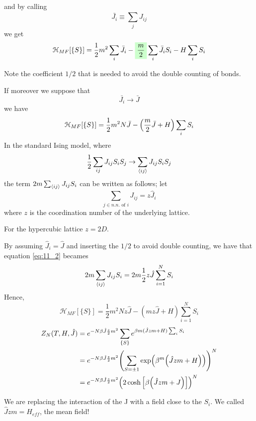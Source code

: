 \documentclass[../main/main.tex]{subfiles}
\begin{document}
and by calling
\begin{equation}
  \bar{J_i} \equiv  \sum_{j}^{} J_{ij}
\end{equation}
we get
\begin{equation}
    \mathcal{H}_{MF} [ \{ S \}  ]  = \frac{1}{2} m^2 \sum_{i}^{} \bar{J_i} - \mathcolorbox{green!20}{\frac{m}{2}} \sum_{i}^{} \bar{J_i} S_i - H \sum_{i}^{} S_i
\end{equation}
\begin{remark}
Note the coefficient \( 1/2 \) that is needed to avoid the double counting of bonds.
\end{remark}
If moreover we suppose that
\begin{equation*}
  \bar{J_i} \rightarrow \bar{J}
\end{equation*}
we have
\begin{equation}
  \mathcal{H}_{MF} [ \{ S \}  ] = \frac{1}{2} m^2 N \bar{J} - \qty(\frac{m}{2}\bar{J} +H) \sum_{i}^{} S_i
\end{equation}
In the standard Ising model, where
\begin{equation}
  \frac{1}{2} \sum_{ij}^{} J_{ij} S_i S_j \rightarrow \sum_{\expval{ij} }^{} J_{ij}    S_i S_j
\end{equation}
the term \( 2 m \sum_{\expval{ij} }^{}  J_{ij} S_i \) can be written as follows;
let
\begin{equation}
  \sum_{j \in n.n.\text{ of } i}^{} J_{ij} = z \hat{J}_i
\end{equation}
where \( z \) is the coordination number of the underlying lattice.
\begin{remark}
For the hypercubic lattice \( z=2D \).
\end{remark}
By assuming \( \hat{J}_i = \hat{J}  \) and inserting the \( 1/2 \) to avoid double counting, we have that equation \eqref{eq:11_2} becames
\begin{equation}
  2m \sum_{\expval{ij} }^{}  J_{ij} S_i = 2 m \frac{1}{2} z \hat{J} \sum_{i=1}^{N} S_i
\end{equation}
Hence,
\begin{equation}
  \mathcal{H}_{MF} [ \{ S \}  ] = \frac{1}{2} m^2 N z \hat{J} - (m z \hat{J} + H ) \sum_{i=1}^{N} S_i
\end{equation}
\begin{equation}
\begin{split}
  Z_N (T,H,\hat{J} ) &= e^{-N \beta \hat{J} \frac{z}{2} m^2 }  \sum_{\{ S \}  }^{} e^{\beta m (\hat{J}zm+H )\sum_{i}^{} S_i }   \\
  & = e^{-N \beta \hat{J} \frac{z}{2} m^2 } \qty(\sum_{S = \pm 1}^{} \exp (\beta ^m \qty(\hat{J}zm+H ) )   )^N \\
  & = e^{-N \beta \hat{J} \frac{z}{2} m^2 } \qty(2 \cosh \qty[\beta \qty(\hat{J}zm+J ) ] )^N
\end{split}
\end{equation}
\begin{remark}
We are replacing the interaction of the J with a field close to the \( S_i \). We called \( \hat{J} z m = H_{eff}  \), the mean field!
\end{remark}
\end{document}
